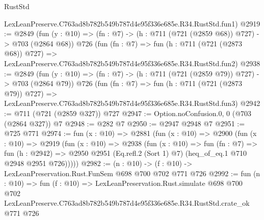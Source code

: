\begin{lexlean}{RustStd}
\begin{coremodule}
    LexLeanPreserve.C763ad8b782b549b787d4e95f336e685e.R34.RustStd.fun1)
@2919 := @2849
    (fun (y : @10) => (fn : @7) -> (h : @711 (@721 (@2859 @68)) @727) -> @703 (@2864 @68))
    @726
    (fun (fn : @7) =>
    fun (h : @711 (@721 (@2873 @68)) @727) =>
    LexLeanPreserve.C763ad8b782b549b787d4e95f336e685e.R34.RustStd.fun2)
@2938 := @2849
    (fun (y : @10) => (fn : @7) -> (h : @711 (@721 (@2859 @79)) @727) -> @703 (@2864 @79))
    @726
    (fun (fn : @7) =>
    fun (h : @711 (@721 (@2873 @79)) @727) =>
    LexLeanPreserve.C763ad8b782b549b787d4e95f336e685e.R34.RustStd.fun3)
@2942 := @711 (@721 (@2859 @327)) @727
@2947 := Option.noConfusion.{0, 0} (@703 (@2864 @327)) @7
@2948 := @282 @7
@2950 := @2947 @2948 @7
@2951 := @725 @771
@2974 := fun (x : @10) =>
  @2881
    (fun (x : @10) =>
    @2900
      (fun (x : @10) =>
      @2919
        (fun (x : @10) =>
        @2938
          (fun (x : @10) =>
          fun (fn : @7) =>
          fun (h : @2942) =>
          @2950 @2951 (Eq.refl.{2} (Sort 1) @7) (heq_of_eq.{1} @710 @2948 @2951 @726)))))
@2982 := (n : @10) -> (f : @10) -> LexLeanPreservation.Rust.FunSem @698 @700 @702 @771 @726
@2992 := fun (n : @10) =>
  fun (f : @10) =>
  LexLeanPreservation.Rust.simulate
    @698
    @700
    @702
    LexLeanPreserve.C763ad8b782b549b787d4e95f336e685e.R34.RustStd.crate_ok
    @771
    @726
\end{coremodule}
\end{lexlean}
